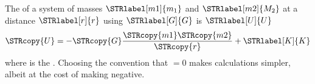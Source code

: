 \documentclass{article}
\begin{document}
The  of a system of masses $\STRlabel[m1]{m_1}$
and $\STRlabel[m2]{M_2}$ at a distance
$\STRlabel[r]{r}$ using  $\STRlabel[G]{G}$
is $\STRlabel[U]{U}$
\begin{equation}
  \STRcopy{U} = -\STRcopy{G}\frac{\STRcopy{m1}\STRcopy{m2}}{\STRcopy{r}}+\STRlabel[K]{K}
\end{equation}
where  is the . Choosing the convention
that $=0$ makes calculations simpler, albeit at the cost of
making  negative.
\end{document}

